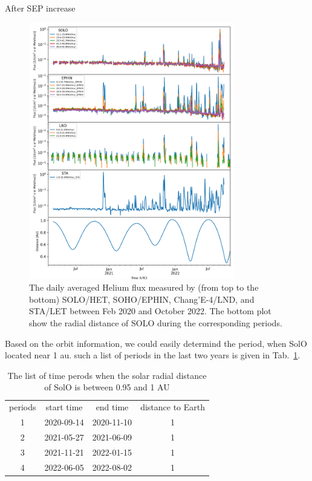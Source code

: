 After SEP increase
\begin{figure}
    \centering
    \includegraphics[width = 0.8\textwidth]{images/ACR/overview_Helium_4_instrument.png}
    \caption{The daily averaged Helium flux measured by (from top to the bottom) SOLO/HET, SOHO/EPHIN, Chang'E-4/LND, and STA/LET between Feb 2020 and October 2022. The bottom plot show the radial distance of SOLO during the corresponding periods.
    }
    \label{fig:overview}
\end{figure}


Based on the orbit information, we could easily determind the period, when \ac{SolO} located near 1 au. such a list of periods in the last two years is given in Tab.~\ref{tab:1AU_period}.

\begin{table}[]
    \centering
	\caption{The list of time perods when the solar radial distance of \ac{SolO} is between 0.95 and 1 AU}
	\label{tab:1AU_period}
    \begin{tabular}{|c|c|c|c|}
	periods & start time & end time & distance to Earth \\
	1	& 2020-09-14 & 2020-11-10	& 1 \\
	2	& 2021-05-27 & 2021-06-09	& 1 \\
	3	& 2021-11-21 & 2022-01-15	& 1 \\
	4	& 2022-06-05 & 2022-08-02	& 1 \\
    \end{tabular}
\end{table}


